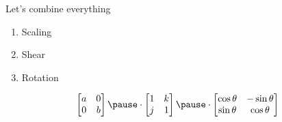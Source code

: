 \documentclass{beamer}
\begin{document}
\begin{frame}{Let's combine everything}
  
  \begin{enumerate}
    \item Scaling\pause
    \item Shear\pause
    \item Rotation\pause
  \end{enumerate}

  \vspace{1cm}

  \[
    \begin{bmatrix}
      a & 0 \\
      0 & b
    \end{bmatrix}\pause
    \cdot
    \begin{bmatrix}
      1 & k \\
      j & 1
    \end{bmatrix}\pause
    \cdot
    \begin{bmatrix}
      \cos{\theta} & -\sin{\theta} \\
      \sin{\theta} & \cos{\theta}
    \end{bmatrix}
  \]
\end{frame}
\end{document}
